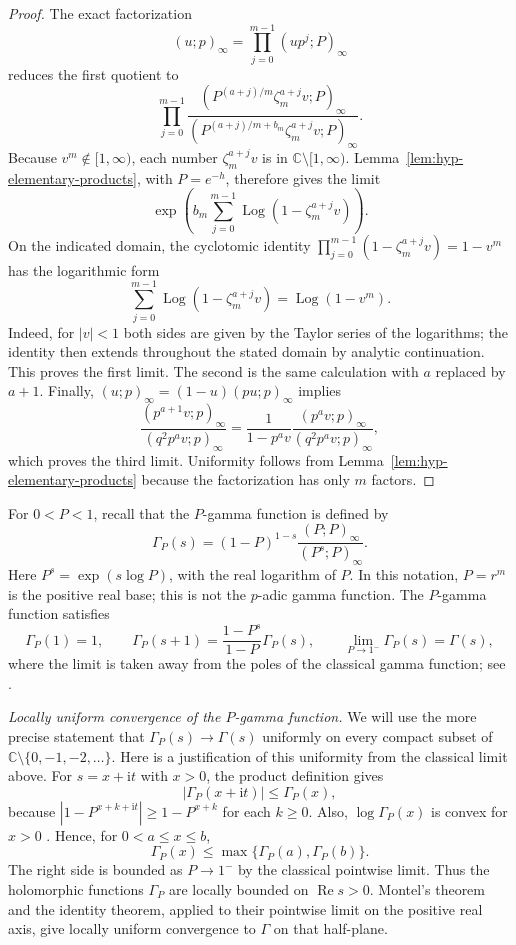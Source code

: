\documentclass[12pt]{amsart}
\theoremstyle{definition}
\numberwithin{equation}{section}
\theoremstyle{definition}
\let\ge\geqslant
\let\le\leqslant
\def\C{{\mathbb C}}
\def\beq{\begin{equation}}
\def\eeq{\end{equation}}
\begin{document}
\begin{proof}
The exact factorization
\beq\label{eq:hyp-factorization}
 (u;p)_\infty=\prod_{j=0}^{m-1}(up^j;P)_\infty
\eeq
reduces the first quotient to
\[
 \prod_{j=0}^{m-1}
 \frac{(P^{(a+j)/m}\zeta_m^{a+j}v;P)_\infty}
      {(P^{(a+j)/m+b_m}\zeta_m^{a+j}v;P)_\infty}.
\]
Because $v^m\notin[1,\infty)$, each number
$\zeta_m^{a+j}v$ is in $\C\setminus[1,\infty)$.
Lemma~\ref{lem:hyp-elementary-products}, with $P=e^{-h}$,
therefore gives the limit
\[
 \exp\left(b_m\sum_{j=0}^{m-1}
    \operatorname{Log}(1-\zeta_m^{a+j}v)\right).
\]
On the indicated domain, the cyclotomic identity
$\prod_{j=0}^{m-1}(1-\zeta_m^{a+j}v)=1-v^m$
has the logarithmic form
\[
 \sum_{j=0}^{m-1}\operatorname{Log}(1-\zeta_m^{a+j}v)
 =\operatorname{Log}(1-v^m).
\]
Indeed, for $|v|<1$ both sides are given by the Taylor
series of the logarithms; the identity then extends
throughout the stated domain by analytic continuation.
This proves the first limit.  The second is the same
calculation with $a$ replaced by $a+1$.  Finally,
$(u;p)_\infty=(1-u)(pu;p)_\infty$ implies
\[
 \frac{(p^{a+1}v;p)_\infty}{(q^2p^av;p)_\infty}
 =\frac{1}{1-p^av}
   \frac{(p^av;p)_\infty}{(q^2p^av;p)_\infty},
\]
which proves the third limit.  Uniformity follows from
Lemma~\ref{lem:hyp-elementary-products} because the
factorization has only $m$ factors.
\end{proof}

For $0<P<1$, recall that the $P$-gamma function is defined by
\beq\label{eq:hyp-P-gamma-definition}
 \Gamma_P(s)=(1-P)^{1-s}
       \frac{(P;P)_\infty}{(P^s;P)_\infty}.
\eeq
Here $P^s=\exp(s\log P)$, with the real logarithm of $P$.
In this notation, $P=r^m$ is the positive real base; this is
not the $p$-adic gamma function.  The $P$-gamma function satisfies
\[
 \Gamma_P(1)=1,\qquad
 \Gamma_P(s+1)=\frac{1-P^s}{1-P}\Gamma_P(s),\qquad
 \lim_{P\to1^-}\Gamma_P(s)=\Gamma(s),
\]
where the limit is taken away from the poles of the classical
gamma function; see \cite[(5.18.4), (5.18.7), and
(5.18.10)]{DLMF}.

\medskip
\noindent\emph{Locally uniform convergence of the $P$-gamma function.}
We will use the more precise statement that
$\Gamma_P(s)\to\Gamma(s)$ uniformly on every compact subset of
$\C\setminus\{0,-1,-2,\ldots\}$. Here is a justification of
this uniformity from the classical limit above.
For $s=x+\mathrm{i}t$ with $x>0$, the product definition gives
\[
 |\Gamma_P(x+\mathrm{i}t)|\le\Gamma_P(x),
\]
because $|1-P^{x+k+\mathrm{i}t}|\ge1-P^{x+k}$ for each $k\ge0$.
Also, $\log\Gamma_P(x)$ is convex for $x>0$
\cite[Section~5.18(ii)]{DLMF}. Hence, for $0<a\le x\le b$,
\[
 \Gamma_P(x)\le\max\{\Gamma_P(a),\Gamma_P(b)\}.
\]
The right side is bounded as $P\to1^-$ by the classical
pointwise limit. Thus the holomorphic functions $\Gamma_P$
are locally bounded on $\operatorname{Re}s>0$. Montel's
theorem and the identity theorem, applied to their pointwise
limit on the positive real axis, give locally uniform
convergence to $\Gamma$ on that half-plane.
\end{document}
